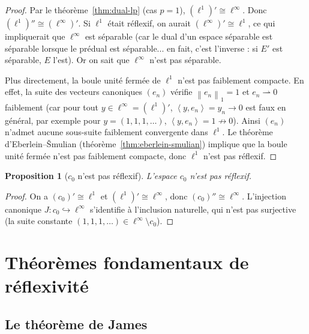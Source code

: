 \documentclass[a4paper,12pt]{book}
\newcommand{\norm}[1]{\left\| #1 \right\|}
\newcommand{\inner}[2]{\left\langle #1, #2 \right\rangle}
\newcommand{\weakto}{\rightharpoonup}
\theoremstyle{definition}
\theoremstyle{plain}
\newtheorem{proposition}[definition]{Proposition}
\theoremstyle{remark}
\begin{document}
\begin{proof}
Par le théorème~\ref{thm:dual-lp} (cas $p = 1$), $(\ell^1)' \cong \ell^\infty$.
Donc $(\ell^1)'' \cong (\ell^\infty)'$. Si $\ell^1$ était réflexif, on aurait
$(\ell^\infty)' \cong \ell^1$, ce qui impliquerait que $\ell^\infty$ est séparable
(car le dual d'un espace séparable est séparable lorsque le prédual est séparable...
en fait, c'est l'inverse : si $E'$ est séparable, $E$ l'est). Or on sait
que $\ell^\infty$ n'est pas séparable.

Plus directement, la boule unité fermée de $\ell^1$ n'est pas faiblement
compacte. En effet, la suite des vecteurs canoniques
$(e_n)$ vérifie $\norm{e_n}_1 = 1$ et $e_n \weakto 0$ faiblement (car pour tout
$y \in \ell^\infty = (\ell^1)'$, $\inner{y}{e_n} = y_n \to 0$ est faux en général,
par exemple pour $y = (1,1,1,\ldots)$, $\inner{y}{e_n} = 1 \not\to 0$).
Ainsi $(e_n)$ n'admet aucune sous-suite faiblement convergente dans $\ell^1$.
Le théorème d'Eberlein--\v{S}mulian (théorème~\ref{thm:eberlein-smulian})
implique que la boule unité fermée n'est pas faiblement compacte, donc $\ell^1$
n'est pas réflexif.
\end{proof}

\begin{proposition}[$c_0$ n'est pas réflexif]
\label{prop:c0-non-reflexif}
L'espace $c_0$ n'est pas réflexif.
\end{proposition}

\begin{proof}
On a $(c_0)' \cong \ell^1$ et $(\ell^1)' \cong \ell^\infty$, donc
$(c_0)'' \cong \ell^\infty$. L'injection canonique $J : c_0 \hookrightarrow \ell^\infty$
s'identifie à l'inclusion naturelle, qui n'est pas surjective (la suite
constante $(1,1,1,\ldots) \in \ell^\infty \setminus c_0$).
\end{proof}

\section{Théorèmes fondamentaux de réflexivité}
\label{sec:thm-reflexivite}

\subsection{Le théorème de James}
\label{subsec:james}
\end{document}
